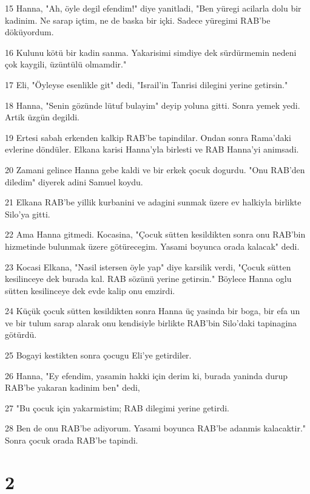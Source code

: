 \par 15 Hanna, "Ah, öyle degil efendim!" diye yanitladi, "Ben yüregi acilarla dolu bir kadinim. Ne sarap içtim, ne de baska bir içki. Sadece yüregimi RAB'be döküyordum.
\par 16 Kulunu kötü bir kadin sanma. Yakarisimi simdiye dek sürdürmemin nedeni çok kaygili, üzüntülü olmamdir."
\par 17 Eli, "Öyleyse esenlikle git" dedi, "Israil'in Tanrisi dilegini yerine getirsin."
\par 18 Hanna, "Senin gözünde lütuf bulayim" deyip yoluna gitti. Sonra yemek yedi. Artik üzgün degildi.
\par 19 Ertesi sabah erkenden kalkip RAB'be tapindilar. Ondan sonra Rama'daki evlerine döndüler. Elkana karisi Hanna'yla birlesti ve RAB Hanna'yi animsadi.
\par 20 Zamani gelince Hanna gebe kaldi ve bir erkek çocuk dogurdu. "Onu RAB'den diledim" diyerek adini Samuel koydu.
\par 21 Elkana RAB'be yillik kurbanini ve adagini sunmak üzere ev halkiyla birlikte Silo'ya gitti.
\par 22 Ama Hanna gitmedi. Kocasina, "Çocuk sütten kesildikten sonra onu RAB'bin hizmetinde bulunmak üzere götürecegim. Yasami boyunca orada kalacak" dedi.
\par 23 Kocasi Elkana, "Nasil istersen öyle yap" diye karsilik verdi, "Çocuk sütten kesilinceye dek burada kal. RAB sözünü yerine getirsin." Böylece Hanna oglu sütten kesilinceye dek evde kalip onu emzirdi.
\par 24 Küçük çocuk sütten kesildikten sonra Hanna üç yasinda bir boga, bir efa un ve bir tulum sarap alarak onu kendisiyle birlikte RAB'bin Silo'daki tapinagina götürdü.
\par 25 Bogayi kestikten sonra çocugu Eli'ye getirdiler.
\par 26 Hanna, "Ey efendim, yasamin hakki için derim ki, burada yaninda durup RAB'be yakaran kadinim ben" dedi,
\par 27 "Bu çocuk için yakarmistim; RAB dilegimi yerine getirdi.
\par 28 Ben de onu RAB'be adiyorum. Yasami boyunca RAB'be adanmis kalacaktir." Sonra çocuk orada RAB'be tapindi.

\chapter{2}

